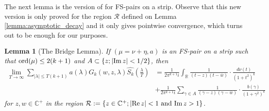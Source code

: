 \documentclass[a4paper,reqno,12pt]{amsart}
\newtheorem{lemma}[theorem]{Lemma}
\newcommand{\R}{\mathcal{R}}
\renewcommand{\r}{\mathbb{R}}
\newcommand{\cp}{\mathbb{C}} %
\newcommand{\ft}{\widehat}
\newcommand{\la}{\lambda}
\newcommand{\ga}{\gamma}
\newcommand{\ord}{{\rm ord}}
\newcommand{\ov}[1]{\overline{#1}}
\newcommand{\w}{\ov{w}}
\newcommand{\cd}{\cdot}
\newcommand{\1}{{\bf 1}}
\newcommand{\ra}{\rightarrow}
\renewcommand{\Re}{{\rm Re}\,}
\renewcommand{\Im}{{\rm Im}\,}
\begin{document}
The next lemma is the version of \cite[Bridge Lemma]{GV} for FS-pairs on a strip. Observe that this new version is only proved for the region $\R$ defined on Lemma \ref{lemma:asymptotic_decay} and it only gives pointwise convergence, which turns out to be enough for our purposes.
\begin{lemma}[The Bridge Lemma]
\label{thm:bridge}
If $(\mu=\nu+\eta,a)$ is an FS-pair on a strip such that $\ord(\mu)\leq 2(k+1)$ and $A\subset \{z;|\Im{z}|<1/2\}$, then
\begin{align}
\label{eq:bridge}
\lim_{T\ra\infty} \sum_{|\la|\leq T(k+1)} a(\la)G_k(w,z,\la){\ft{S_k}\left(\frac{\la}{T}\right)}&=\frac{1}{2\pi^{k+1}i}\int_{\r} \frac{1}{(t-z)(t-\w)}\cd\frac{d\nu(t)}{(1+t^2)^k}\\
&+\frac{1}{2\pi^{k+1}i}\sum_{\ga\in A} \frac{1}{(\ga-z)(\ga-\w)}\cd\frac{b(\ga)}{(1+\ga^2)^k}
\end{align}
for $z,w \in \cp^+$ in the region $\R:=\{z\in\cp^+;|\Re{z}|<1 \text{ and } \Im{z}>1\}$.
\end{lemma}
\end{document}
